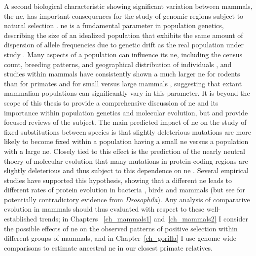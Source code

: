 A second biological characteristic showing significant variation
between mammals, the \ac{ne}, has important consequences for the study
of genomic regions subject to natural selection
\citep{Charlesworth2009}. \ac{ne} is a fundamental parameter in
population genetics, describing the size of an idealized population
that exhibits the same amount of dispersion of allele frequencies due
to genetic drift as the real population under study
\citep{Wright1931,Woolfit2009}. Many aspects of a population can
influence its \ac{ne}, including the census count, breeding patterns,
and geographical distribution of individuals \citep{Caballero1994},
and studies within mammals have consistently shown a much larger
\ac{ne} for rodents than for primates and for small versus large
mammals \citep{EyreWalker2002,Popadin2007,Halligan2010}, suggesting
that extant mammalian populations can significantly vary in this
parameter. It is beyond the scope of this thesis to provide a
comprehensive discussion of \ac{ne} and its importance within
population genetics and molecular evolution, but \citet{Woolfit2009}
and \citet{Charlesworth2009} provide focused reviews of the
subject. The main predicted impact of \ac{ne} on the study of fixed
substitutions between species is that slightly deleterious mutations
are more likely to become fixed within a population having a small
\ac{ne} versus a population with a large \ac{ne}. Closely tied to this
effect is the prediction of the nearly neutral thoery of molecular
evolution \citep{Kimura1985} that many mutations in protein-coding
regions are slightly deleterious and thus subject to this dependence
on \ac{ne} \citep{Kimura1974,Kimura1985,Ohta1992}. Several empirical
studies have supported this hypothesis, showing that a different
\ac{ne} leads to different rates of protein evolution in bacteria
\citep{Moran2008,Warnecke2011}, birds \citep{Axelsson2009} and mammals
\citep{Kosiol2008,Ellegren2009} (but see \citet{Bachtrog2008} for
potentially contradictory evidence from \emph{Drosophila}). Any
analysis of comparative evolution in mammals should thus evaluated
with respect to these well-established trends; in Chapters~
\ref{ch_mammals1} and~\ref{ch_mammals2} I consider the possible
effects of \ac{ne} on the observed patterns of positive selection
within different groups of mammals, and in Chapter~\ref{ch_gorilla} I
use genome-wide comparisons to estimate ancestral \ac{ne} in our
closest primate relatives.

